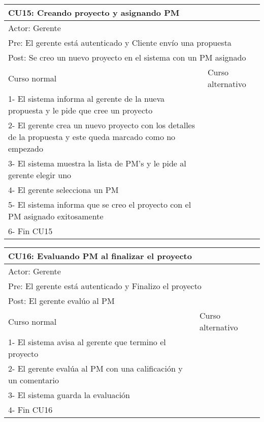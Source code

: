 \begin{table}[H]
  \begin{adjustbox}{max width = \textwidth}
  \begin{tabular}{|l|l|}
    \hline
    \multicolumn{2}{|l|}{CU15: Creando proyecto y asignando PM} \\\hline
    \multicolumn{2}{|l|}{Actor: Gerente} \\\hline
    \multicolumn{2}{|l|}{Pre: El gerente está autenticado y Cliente envío una propuesta} \\\hline
    \multicolumn{2}{|l|}{Post: Se creo un nuevo proyecto en el sistema con un PM asignado} \\\hline
     Curso normal & Curso alternativo\\ \hline
	 1- El sistema informa al gerente de la nueva propuesta y le pide que cree un proyecto & \\ \hline
	 2- El gerente crea un nuevo proyecto con los detalles de la propuesta y este queda marcado como no empezado & \\ \hline
	 3- El sistema muestra la lista de PM's y le pide al gerente elegir uno & \\ \hline
     4- El gerente selecciona un PM& \\ \hline
	 5- El sistema informa que se creo el proyecto con el PM asignado exitosamente & \\ \hline
     6- Fin CU15 & \\ \hline
  \end{tabular}
  \end{adjustbox}
\end{table}

\begin{table}[H]
  \begin{adjustbox}{max width = \textwidth}
  \begin{tabular}{|l|l|}
    \hline
    \multicolumn{2}{|l|}{CU16: Evaluando PM al finalizar el proyecto} \\\hline
    \multicolumn{2}{|l|}{Actor: Gerente} \\\hline
    \multicolumn{2}{|l|}{Pre: El gerente está autenticado y Finalizo el proyecto} \\\hline
    \multicolumn{2}{|l|}{Post: El gerente evalúo al PM} \\\hline
     Curso normal & Curso alternativo\\ \hline
	 1- El sistema avisa al gerente que termino el proyecto & \\ \hline
	 2- El gerente evalúa al PM con una calificación y un comentario& \\ \hline
	 3- El sistema guarda la evaluación & \\ \hline
   4- Fin CU16 & \\ \hline
  \end{tabular}
  \end{adjustbox}
\end{table}

